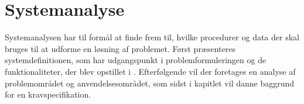 \chapter{Systemanalyse}\label{chapter:systemanalyse}
Systemanalysen har til formål at finde frem til, hvilke procedurer og data der skal bruges til at udforme en løsning af problemet.
Først præsenteres systemdefinitionen, som har udgangspunkt i problemformuleringen og de funktionaliteter, der blev opstillet i .
Efterfølgende vil der foretages en analyse af problemområdet og anvendelsesområdet, som sidst i kapitlet vil danne baggrund for en kravspecifikation.






